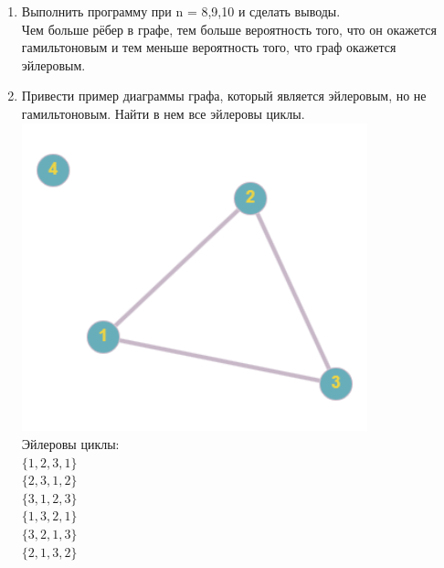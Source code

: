 \documentclass[a4paper,14pt]{extarticle}
\begin{document}
\begin{enumerate}[1.]
\item Выполнить программу при n = 8,9,10 и сделать выводы.\\
Чем больше рёбер в графе, тем больше вероятность того, что он окажется
гамильтоновым и тем меньше вероятность того, что граф окажется эйлеровым.
\item Привести пример диаграммы графа, который является эйлеровым, 
но не гамильтоновым. Найти в нем все эйлеровы циклы.\\
\includegraphics[width=100mm]{4}\\
Эйлеровы циклы:\\
$\{1, 2, 3, 1\}$\\
$\{2, 3, 1, 2\}$\\
$\{3, 1, 2, 3\}$\\
$\{1, 3, 2, 1\}$\\
$\{3, 2, 1, 3\}$\\
$\{2, 1, 3, 2\}$


\end{enumerate}
\end{document}
